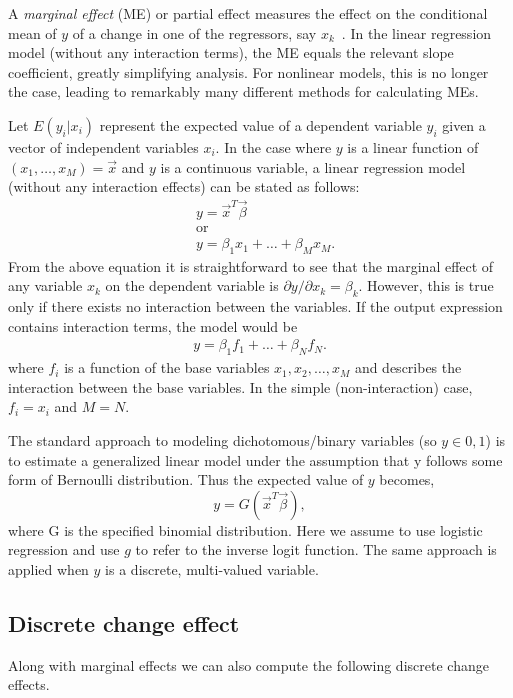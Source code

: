 A \emph{marginal effect} (ME) or partial effect measures the effect on the
conditional mean of $y$ of a change in one of the regressors, say
$x_k$~\cite{cameron2009}. In the linear regression model (without any interaction
terms), the ME equals the relevant slope coefficient, greatly simplifying analysis.
For nonlinear models, this is no longer the case, leading to remarkably many
different methods for calculating MEs.

Let $E(y_i | x_i)$ represent the expected value of a dependent variable $y_i$
given a vector of independent variables $x_i$. In the case where $y$ is a
linear function of $(x_1, \dots, x_M) = \vec{x}$ and $y$ is a continuous variable, a
linear regression model (without any interaction effects) can be stated as follows:
\begin{align*}
    & y = \vec{x}^T \vec{\beta} \\
    & \text{or} \\
    & y = \beta_1 x_1 +  \ldots  + \beta_M x_M.
\end{align*}
From the above equation it is straightforward to see that the marginal effect of
any variable $x_k$ on the dependent variable is $\partial y / \partial x_k =
\beta_k$. However, this is true only if there exists no interaction between the
variables. If the output expression contains interaction terms, the model would be
\begin{gather*}
    y = \beta_1 f_1 + \ldots + \beta_N f_N.
\end{gather*}
where $f_i$ is a function of the base variables $x_1, x_2, \ldots, x_M$ and
describes the interaction between the base variables. In the simple
(non-interaction) case, $f_i = x_i$ and $M = N$.

The standard approach to modeling dichotomous/binary variables
(so $y \in {0, 1}$) is to estimate a generalized linear model under the
assumption that y follows some form of Bernoulli distribution. Thus the expected
value of $y$ becomes,
\begin{equation*}
    y = G(\vec{x}^T \vec{\beta}),
  \end{equation*}
where G is the specified binomial distribution. Here we assume to use
logistic regression and use $g$ to refer to the inverse logit function. The same
approach is applied when $y$ is a discrete, multi-valued variable.

\subsection{Discrete change effect} %
\label{sub:discrete_change_effect}
Along with marginal effects we can also compute the following discrete change
effects.

